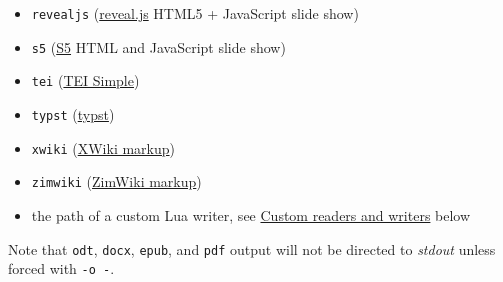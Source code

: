 \documentclass[
  b5paper
]{book}
\begin{document}
\begin{description}
\begin{itemize}
  \texttt{dzslides} (\href{https://paulrouget.com/dzslides/}{DZSlides}
  HTML5 + JavaScript slide show)
\item
  \texttt{revealjs} (\href{https://revealjs.com/}{reveal.js} HTML5 +
  JavaScript slide show)
\item
  \texttt{s5} (\href{https://meyerweb.com/eric/tools/s5/}{S5} HTML and
  JavaScript slide show)
\item
  \texttt{tei} (\href{https://github.com/TEIC/TEI-Simple}{TEI Simple})
\item
  \texttt{typst} (\href{https://typst.app}{typst})
\item
  \texttt{xwiki}
  (\href{https://www.xwiki.org/xwiki/bin/view/Documentation/UserGuide/Features/XWikiSyntax/}{XWiki
  markup})
\item
  \texttt{zimwiki}
  (\href{https://zim-wiki.org/manual/Help/Wiki_Syntax.html}{ZimWiki
  markup})
\item
  the path of a custom Lua writer, see
  \hyperref[custom-readers-and-writers]{Custom readers and writers}
  below
\end{itemize}

Note that \texttt{odt}, \texttt{docx}, \texttt{epub}, and \texttt{pdf}
output will not be directed to \emph{stdout} unless forced with
\texttt{-o\ -}.


\end{description}
\end{document}
